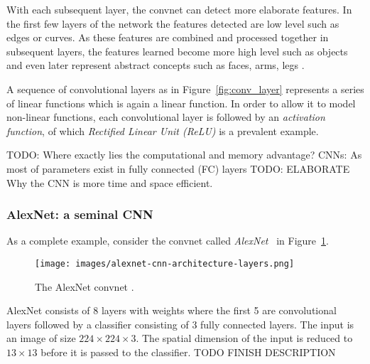 \documentclass[12pt,a4paper]{article}
\begin{document}
With each subsequent layer, the convnet can detect more elaborate features. In the first few layers of the network the features detected are low level such as edges or curves. As these features are combined and processed together in subsequent layers, the features learned become more high level such as objects and even later represent abstract concepts such as faces, arms, legs \cite{DeepVis}.

A sequence of convolutional layers as in Figure~\ref{fig:conv_layer} represents a series of linear functions which is again a linear function. In order to allow it to model non-linear functions, each convolutional layer is followed by an \textit{activation function}, of which \textit{Rectified Linear Unit (ReLU)} is a prevalent example.

\par TODO: Where exactly lies the computational and memory advantage? CNNs: As most of parameters exist in fully connected (FC) layers TODO: ELABORATE Why the CNN is more time and space efficient.

\subsubsection{AlexNet: a seminal CNN}\label{subsubsec:alexnet}
As a complete example, consider the convnet called \textit{AlexNet}~\cite{AlexNet} in Figure~\ref{fig:AlexNet}.
\begin{figure}[ht]
\centering
\texttt{[image: images/alexnet-cnn-architecture-layers.png]}
\caption{The AlexNet convnet \cite{AlexNet}.}
\label{fig:AlexNet}
\end{figure}
AlexNet consists of 8 layers with weights where the first 5 are convolutional layers followed by a classifier consisting of 3  fully connected layers. The input is an image of size $224 \times 224 \times 3$. The spatial dimension of the input is reduced to $13 \times 13$ before it is passed to the classifier. TODO FINISH DESCRIPTION
\end{document}
